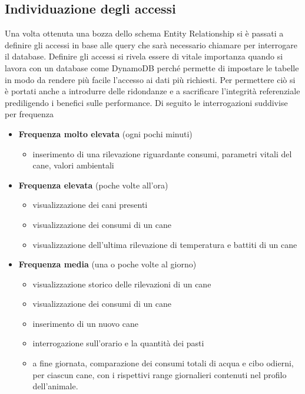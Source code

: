     \subsection{Individuazione degli accessi}
    Una volta ottenuta una bozza dello schema Entity Relationship si è passati a definire gli accessi in base alle query che sarà necessario chiamare per interrogare il database.
    Definire gli accessi si rivela essere di vitale importanza quando si lavora con un database come DynamoDB perché permette di impostare le tabelle in modo da rendere più facile l'accesso ai dati più richiesti. Per permettere ciò si è portati anche a introdurre delle ridondanze e a sacrificare l'integrità referenziale prediligendo i benefici sulle performance.
    Di seguito le interrogazioni suddivise per frequenza
    \begin{itemize}
    \item \textbf{Frequenza molto elevata} (ogni pochi minuti)
            \begin{itemize}
                \item inserimento di una rilevazione riguardante consumi, parametri vitali del cane, valori ambientali
            \end{itemize}
    \item \textbf{Frequenza elevata} (poche volte all'ora)
            \begin{itemize}
                \item visualizzazione dei cani presenti
                \item visualizzazione dei consumi di un cane
                \item visualizzazione dell'ultima rilevazione di temperatura e battiti di un cane
            \end{itemize}
    \item \textbf{Frequenza media} (una o poche volte al giorno)        
            \begin{itemize}
                \item visualizzazione storico delle rilevazioni di un cane
                \item visualizzazione dei consumi di un cane
                \item inserimento di un nuovo cane 
                \item interrogazione sull'orario e la quantità dei pasti
                \item a fine giornata, comparazione dei consumi totali di acqua e cibo odierni, per ciascun cane, con i rispettivi range giornalieri contenuti nel profilo dell'animale.

\end{itemize}
\end{itemize}
